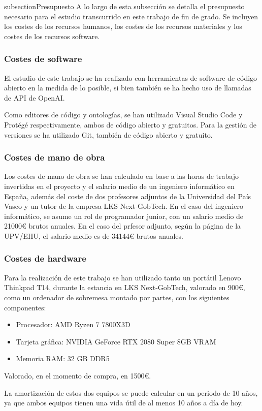                  subsection{Presupuesto}
A lo largo de esta subsección se detalla el presupuesto necesario para el estudio transcurrido en este trabajo de fin de grado. Se incluyen los costes de los recursos humanos, los costes de los recursos materiales y los costes de los recursos software.

\subsubsection{Costes de software}
El estudio de este trabajo se ha realizado con herramientas de software de código abierto en la medida de lo posible, si bien también se ha hecho uso de llamadas de API de OpenAI.

Como editores de código y ontologías, se han utilizado Visual Studio Code y Protégé respectivamente, ambos de código abierto y gratuitos. Para la gestión de versiones se ha utilizado Git, también de código abierto y gratuito.


\subsubsection{Costes de mano de obra}
Los costes de mano de obra se han calculado en base a las horas de trabajo invertidas en el proyecto y el salario medio de un ingeniero informático en España, además del coste de dos profesores adjuntos de la Universidad del País Vasco y un tutor de la empresa LKS Next-GobTech.
En el caso del ingeniero informático, se asume un rol de programador junior, con un salario medio de 21000€ brutos anuales. 
En el caso del prfesor adjunto, según la página de la UPV/EHU, el salario medio es de 34144€ brutos anuales. 

\subsubsection{Costes de hardware}
Para la realización de este trabajo se han utilizado tanto un portátil Lenovo Thinkpad T14, durante la estancia en LKS Next-GobTech, valorado en 900€, como un ordenador de sobremesa montado por partes, con los siguientes componentes:

\begin{itemize}
    \item Procesador: AMD Ryzen 7 7800X3D
    \item Tarjeta gráfica: NVIDIA GeForce RTX 2080 Super 8GB VRAM
    \item Memoria RAM: 32 GB DDR5
\end{itemize}

Valorado, en el momento de compra, en 1500€.

La amortización de estos dos equipos se puede calcular en un periodo de 10 años, ya que ambos equipos tienen una vida útil de al menos 10 años a día de hoy.
